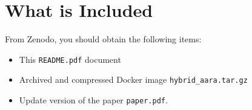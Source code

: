 
\section{What is Included}

From Zenodo, you should obtain the following items:
\begin{itemize}
  \item This \texttt{README.pdf} document
  \item Archived and compressed Docker image \texttt{hybrid\_aara.tar.gz}
  \item Update version of the paper \texttt{paper.pdf}.
\end{itemize}
